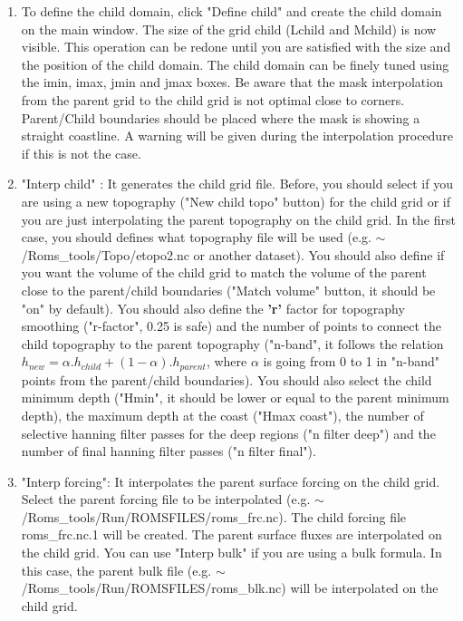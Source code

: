 \begin{enumerate}

\item To define the child domain, click "Define child" and create the child domain on
  the main window. The size of the grid child (Lchild and Mchild) is now visible.
  This operation can be redone until you are satisfied with the size and the position
  of the child domain. The child domain can be finely tuned using the imin, imax,
  jmin and jmax boxes.  Be aware that the mask interpolation from the parent grid to
  the child grid is not optimal close to corners. Parent/Child boundaries should be
  placed where the mask is showing a straight coastline. A warning will be given
  during the interpolation procedure if this is not the case.

\item "Interp child" : It generates the child grid file. Before, you should select if
  you are using a new topography ("New child topo" button) for the child grid or if
  you are just interpolating the parent topography on the child grid. In the first
  case, you should defines what topography file will be used (e.g.
  $\sim$/Roms\_tools/Topo/etopo2.nc or another dataset).  You should also define if
  you want the volume of the child grid to match the volume of the parent close to
  the parent/child boundaries ("Match volume" button, it should be "on" by default).
  You should also define  the \textbf{'r'} factor \citep{Bec93} for topography smoothing
  ("r-factor", 0.25 is safe) and the number of points to connect the child topography
  to the parent topography ("n-band", it follows the relation
  $h_{new}=\alpha.h_{child} + (1-\alpha).h_{parent}$, where $\alpha$ is going from 0
  to 1 in "n-band" points from the parent/child boundaries).  You should also select
  the child minimum depth ("Hmin", it should be lower or equal to the parent minimum
  depth), the maximum depth at the coast ("Hmax coast"), the number of selective
  hanning filter passes for the deep regions ("n filter deep") and the number of
  final hanning filter passes ("n filter final").

\item "Interp forcing": It interpolates the parent surface forcing on the child grid.
  Select the parent forcing file to be interpolated (e.g.
  $\sim$/Roms\_tools/Run/ROMSFILES/roms\_frc.nc).  The child forcing file
  roms\_frc.nc.1 will be created.  The parent surface fluxes are interpolated on the
  child grid.  You can use "Interp bulk" if you are using a bulk formula.  In this
  case, the parent bulk file (e.g. $\sim$/Roms\_tools/Run/ROMSFILES/roms\_blk.nc)
  will be interpolated on the child grid.


\end{enumerate}

